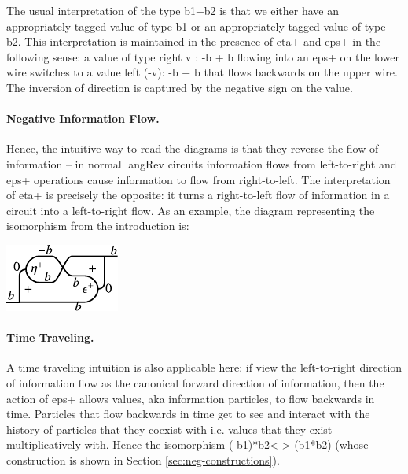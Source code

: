 \documentclass[preprint]{sigplanconf}
\begin{document}
The usual interpretation of the type {{b1+b2}} is that we either have an
appropriately tagged value of type {{b1}} or an appropriately tagged value of
type {{b2}}. This interpretation is maintained in the presence of {{eta+}}
and {{eps+}} in the following sense: a value of type {{right v : -b + b}}
flowing into an {{eps+}} on the lower wire switches to a value 
{{left (-v): -b + b}} that flows backwards on the upper wire. The inversion of
direction is captured by the negative sign on the value. 

\begin{multicols}{2}
\begin{center}
\end{center}
  
\begin{center}
\end{center}  
\end{multicols}

\paragraph*{Negative Information Flow.} 
Hence, the intuitive way to read the diagrams is that they reverse the
flow of information -- in normal {{langRev}} circuits information
flows from left-to-right and {{eps+}} operations cause information to
flow from right-to-left.  The interpretation of {{eta+}} is precisely
the opposite: it turns a right-to-left flow of information in a
circuit into a left-to-right flow.
As an example, the diagram representing the isomorphism from the
introduction is:
\begin{center}
  \includegraphics{diagrams/algebra1.pdf}
\end{center}

\paragraph*{Time Traveling.}
A time traveling intuition is also applicable here: if view the
left-to-right direction of information flow as the canonical forward
direction of information, then the action of {{eps+}} allows values,
aka information particles, to flow backwards in time. Particles that
flow backwards in time get to see and interact with the history of
particles that they coexist with i.e. values that they exist
multiplicatively with. Hence the isomorphism {{(-b1)*b2<->-(b1*b2)}}
(whose construction is shown in Section \ref{sec:neg-constructions}).
\end{document}
